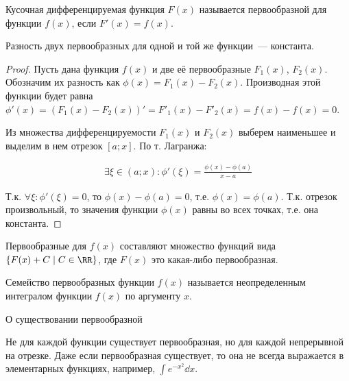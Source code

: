 
\begin{definition}
  Кусочная дифференцируемая функция \(F(x)\) называется первообразной для
  функции \(f(x)\), если \(F'(x) = f(x)\).
\end{definition}

\begin{theorem}
  Разность двух первообразных для одной и той же функции~--- константа.
\end{theorem}
\begin{proof}
  Пусть дана функция \(f(x)\) и две её первообразные \(F_{1}(x)\), \(F_{2}(x)\).
  Обозначим их разность как \(\phi(x) = F_{1}(x) - F_{2}(x)\). Производная этой
  функции будет равна \(
    \phi'(x)
    = (F_{1}(x) - F_{2}(x))'
    = F'_{1}(x) - F'_{2}(x)
    = f(x) - f(x)
    = 0
  \).

  Из множества дифференцируемости \(F_{1}(x)\) и \(F_{2}(x)\) выберем наименьшее
  и выделим в нем отрезок \([a; x]\). По т. Лагранжа:

  \begin{align*}
    \exists \xi \in (a; x) \colon \phi'(\xi) = \frac{\phi(x) - \phi(a)}{x - a}
  \end{align*}

  Т.к. \(\forall \xi \colon \phi'(\xi) = 0\), то \(\phi(x) - \phi(a) = 0\), т.е.
  \(\phi(x) = \phi(a)\). Т.к. отрезок произвольный, то значения функции
  \(\phi(x)\) равны во всех точках, т.е. она константа.
\end{proof}

\begin{corollary}
  Первообразные для \(f(x)\) составляют множество функций вида
  \(\{ F(x) + C \mid C \in \RR \}\), где \(F(x)\) это какая-либо первообразная.
\end{corollary}

\begin{definition}
  Семейство первообразных функции \(f(x)\) называется неопределенным интегралом
  функции \(f(x)\) по аргументу \(x\).
\end{definition}

\begin{remark}
  О существовании первообразной

  Не для каждой функции существует первообразная, но для каждой непрерывной на
  отрезке. Даже если первообразная существует, то она не всегда выражается в
  элементарных функциях, например, \(\int e^{-x^2} \dd x\).
\end{remark}

